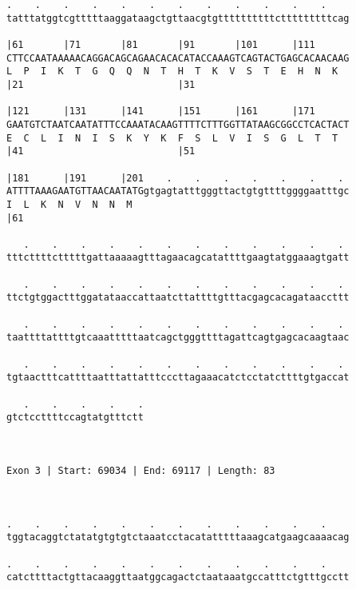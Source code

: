 \documentclass{article}
\begin{document}
\begin{Verbatim}
.    .    .    .    .    .    .    .    .    .    .    .    
tatttatggtcgtttttaaggataagctgttaacgtgttttttttttctttttttttcag
                                                            
|61       |71       |81       |91       |101      |111      
CTTCCAATAAAAACAGGACAGCAGAACACACATACCAAAGTCAGTACTGAGCACAACAAG
L  P  I  K  T  G  Q  Q  N  T  H  T  K  V  S  T  E  H  N  K  
|21                           |31                           
  
|121      |131      |141      |151      |161      |171      
GAATGTCTAATCAATATTTCCAAATACAAGTTTTCTTTGGTTATAAGCGGCCTCACTACT
E  C  L  I  N  I  S  K  Y  K  F  S  L  V  I  S  G  L  T  T  
|41                           |51                           
  
|181      |191      |201    .    .    .    .    .    .    . 
ATTTTAAAGAATGTTAACAATATGgtgagtatttgggttactgtgttttggggaatttgc
I  L  K  N  V  N  N  M                                      
|61                                                         
  
   .    .    .    .    .    .    .    .    .    .    .    . 
tttcttttctttttgattaaaaagtttagaacagcatattttgaagtatggaaagtgatt
                                                            
   .    .    .    .    .    .    .    .    .    .    .    . 
ttctgtggactttggatataaccattaatcttattttgtttacgagcacagataaccttt
                                                            
   .    .    .    .    .    .    .    .    .    .    .    . 
taattttattttgtcaaatttttaatcagctgggttttagattcagtgagcacaagtaac
                                                            
   .    .    .    .    .    .    .    .    .    .    .    . 
tgtaactttcattttaatttattatttcccttagaaacatctcctatcttttgtgaccat
                                                            
   .    .    .    .    .
gtctccttttccagtatgtttctt
                        
                        
 
Exon 3 | Start: 69034 | End: 69117 | Length: 83



.    .    .    .    .    .    .    .    .    .    .    .    
tggtacaggtctatatgtgtgtctaaatcctacatatttttaaagcatgaagcaaaacag
                                                            
.    .    .    .    .    .    .    .    .    .    .    .    
catcttttactgttacaaggttaatggcagactctaataaatgccatttctgtttgcctt
                                                            

\end{Verbatim}
\end{document}
